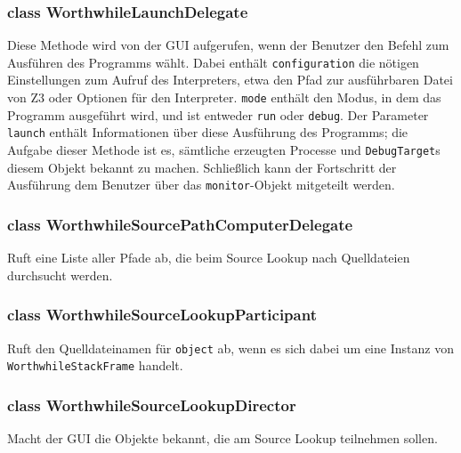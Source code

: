 \subsubsection{class WorthwhileLaunchDelegate}

\begin{description}
	Diese Methode wird von der GUI aufgerufen, wenn der Benutzer den Befehl zum Ausführen des Programms wählt. Dabei enthält \texttt{configuration} die nötigen Einstellungen zum Aufruf des Interpreters, etwa den Pfad zur ausführbaren Datei von Z3 oder Optionen für den Interpreter. \texttt{mode} enthält den Modus, in dem das Programm ausgeführt wird, und ist entweder \texttt{run} oder \texttt{debug}. Der Parameter \texttt{launch} enthält Informationen über diese Ausführung des Programms; die Aufgabe dieser Methode ist es, sämtliche erzeugten Processe und \texttt{DebugTarget}s diesem Objekt bekannt zu machen. Schließlich kann der Fortschritt der Ausführung dem Benutzer über das \texttt{monitor}-Objekt mitgeteilt werden.
\end{description}

\subsubsection{class WorthwhileSourcePathComputerDelegate}

\begin{description}
	Ruft eine Liste aller Pfade ab, die beim Source Lookup nach Quelldateien durchsucht werden.
\end{description}

\subsubsection{class WorthwhileSourceLookupParticipant}

\begin{description}
	 Ruft den Quelldateinamen für \texttt{object} ab, wenn es sich dabei um eine Instanz von \texttt{WorthwhileStackFrame} handelt.
\end{description}

\subsubsection{class WorthwhileSourceLookupDirector}

\begin{description}
	 Macht der GUI die Objekte bekannt, die am Source Lookup teilnehmen sollen.
\end{description}